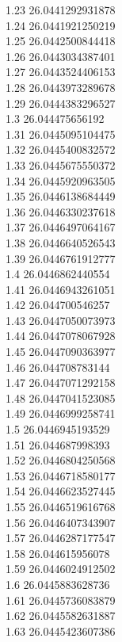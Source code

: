 {1.23	26.0441292931878\\
1.24	26.0441921250219\\
1.25	26.0442500844418\\
1.26	26.0443034387401\\
1.27	26.0443524406153\\
1.28	26.0443973289678\\
1.29	26.0444383296527\\
1.3	26.044475656192\\
1.31	26.0445095104475\\
1.32	26.0445400832572\\
1.33	26.0445675550372\\
1.34	26.0445920963505\\
1.35	26.0446138684449\\
1.36	26.0446330237618\\
1.37	26.0446497064167\\
1.38	26.0446640526543\\
1.39	26.0446761912777\\
1.4	26.0446862440554\\
1.41	26.0446943261051\\
1.42	26.044700546257\\
1.43	26.0447050073973\\
1.44	26.0447078067928\\
1.45	26.0447090363977\\
1.46	26.044708783144\\
1.47	26.0447071292158\\
1.48	26.0447041523085\\
1.49	26.0446999258741\\
1.5	26.0446945193529\\
1.51	26.044687998393\\
1.52	26.0446804250568\\
1.53	26.0446718580177\\
1.54	26.0446623527445\\
1.55	26.0446519616768\\
1.56	26.0446407343907\\
1.57	26.0446287177547\\
1.58	26.044615956078\\
1.59	26.0446024912502\\
1.6	26.0445883628736\\
1.61	26.0445736083879\\
1.62	26.0445582631887\\
1.63	26.0445423607386\\
}
